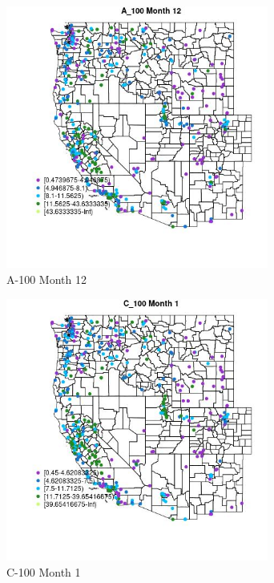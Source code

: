 \begin{figure} 
\centering  
\includegraphics[width=0.77\textwidth]{Code_Outputs/ML_input_report_ML_input_PM25_Step5_part_d_de_duplicated_aves_ML_input_MapObsMo12A_100.jpg} 
\caption{\label{fig:ML_input_report_ML_input_PM25_Step5_part_d_de_duplicated_aves_ML_inputMapObsMo12A_100}A-100 Month 12} 
\end{figure} 
 

\begin{figure} 
\centering  
\includegraphics[width=0.77\textwidth]{Code_Outputs/ML_input_report_ML_input_PM25_Step5_part_d_de_duplicated_aves_ML_input_MapObsMo1C_100.jpg} 
\caption{\label{fig:ML_input_report_ML_input_PM25_Step5_part_d_de_duplicated_aves_ML_inputMapObsMo1C_100}C-100 Month 1} 
\end{figure} 
 

